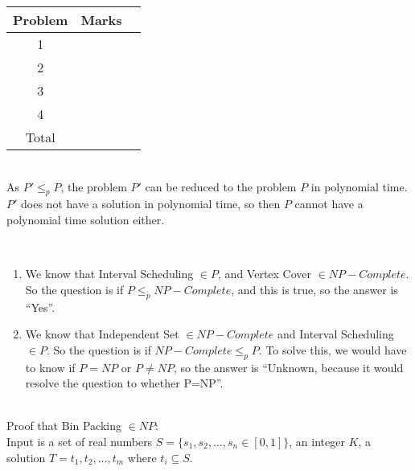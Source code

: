 \documentclass{assignment}
\begin{document}
\begin{center}
\renewcommand{\arraystretch}{2}
\begin{tabular}{|c|c|c|} \hline
Problem & Marks \\ \hline \hline
1 & \\ \hline
2 & \\ \hline
3 & \\ \hline
4 & \\ \hline
Total & \\ \hline
\end{tabular}
\end{center}

\bigskip

\begin{problemlist}

\clearpage
\pbitem
\begin{problem}
\end{problem}
\begin{answer}
\\
As $P'\le_p P$, the problem $P'$ can be reduced to the problem $P$ in polynomial time. $P'$ does not have a solution in polynomial time, so then $P$ cannot have a polynomial time solution either.
\end{answer}
\clearpage
\pbitem
\begin{problem}
\end{problem}
\begin{answer}
\\
\begin{enumerate}
\item We know that Interval Scheduling $\in P$, and Vertex Cover $\in NP-Complete$. So the question is if $P \le_p NP-Complete$, and this is true, so the answer is ``Yes''.
\item We know that Independent Set $\in NP-Complete$ and Interval Scheduling $\in P$. So the question is if $NP-Complete \le_p P$. To solve this, we would have to know if $P=NP$ or $P\neq NP$, so the answer is ``Unknown, because it would resolve the question to whether P=NP''.
\end{enumerate}
\end{answer}
\clearpage
\pbitem
\begin{problem}
\end{problem}
\begin{answer}
\\
Proof that Bin Packing $\in NP$:\\
Input is a set of real numbers $S=\{s_1,s_2,\ldots,s_n\in[0,1]\}$, an integer $K$, a solution $T=t_1,t_2,\ldots,t_m$ where $t_i \subseteq S$.\\

\end{answer}
\end{problemlist}
\end{document}
